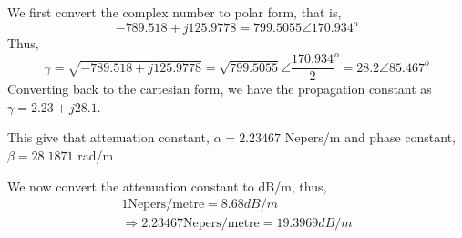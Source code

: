 \begin{exmp}
We first convert the complex number to polar form, that is,
\begin{equation*}
-789.518 + j 125.9778 = 799.5055\angle 170.934^o
\end{equation*}
Thus,
\begin{dmath*}
\gamma = \sqrt{-789.518 + j 125.9778}
= \sqrt{799.5055}\angle {\frac{170.934}{2}}^o
=28.2\angle 85.467^o
\end{dmath*}
Converting back to the cartesian form, we have the propagation constant as $\gamma=2.23 +j 28.1$.

This give that attenuation constant, $\alpha = 2.23467 $ Nepers/m and phase constant, $ \beta = 28.1871 $ rad/m

We now convert the attenuation constant to dB/m, thus,
\begin{align*}
1 \text{Nepers/metre} = 8.68dB/m\\
\Rightarrow 2.23467 \text{Nepers/metre} = 19.3969 dB/m
\end{align*}
\end{exmp} 

